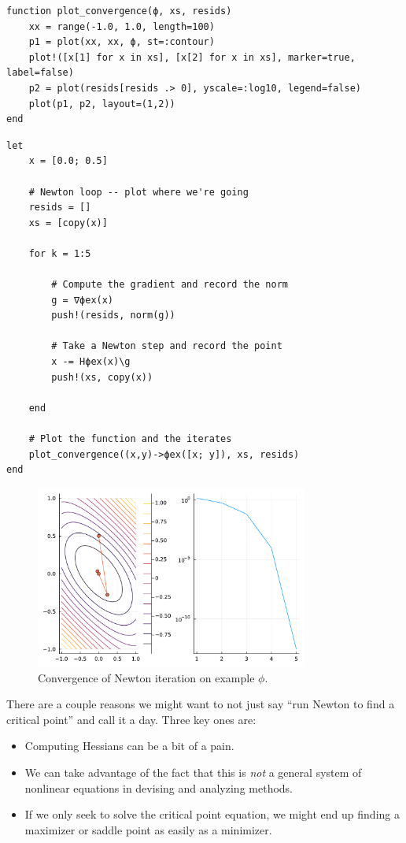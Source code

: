 \documentclass[12pt, leqno]{article} %
\providecommand{\tightlist}{%
  \setlength{\itemsep}{0pt}\setlength{\parskip}{0pt}}
\begin{document}
\begin{verbatim}
function plot_convergence(ϕ, xs, resids)
    xx = range(-1.0, 1.0, length=100)
    p1 = plot(xx, xx, ϕ, st=:contour)
    plot!([x[1] for x in xs], [x[2] for x in xs], marker=true, label=false)
    p2 = plot(resids[resids .> 0], yscale=:log10, legend=false)
    plot(p1, p2, layout=(1,2))
end
\end{verbatim}

\begin{verbatim}
let
    x = [0.0; 0.5]

    # Newton loop -- plot where we're going
    resids = []
    xs = [copy(x)]

    for k = 1:5

        # Compute the gradient and record the norm
        g = ∇ϕex(x)
        push!(resids, norm(g))

        # Take a Newton step and record the point
        x -= Hϕex(x)\g
        push!(xs, copy(x))

    end

    # Plot the function and the iterates
    plot_convergence((x,y)->ϕex([x; y]), xs, resids)
end
\end{verbatim}

\begin{figure}
\begin{center}
  \includegraphics[width=0.8\textwidth]{fig/2023-03-31-newton.pdf}
\end{center}
\caption{Convergence of Newton iteration on example $\phi$.}
\label{fig:newton}
\end{figure}

There are a couple reasons we might want to not just say ``run Newton to
find a critical point'' and call it a day. Three key ones are:

\begin{itemize}
\tightlist
\item
  Computing Hessians can be a bit of a pain.
\item
  We can take advantage of the fact that this is \emph{not} a general
  system of nonlinear equations in devising and analyzing methods.
\item
  If we only seek to solve the critical point equation, we might end up
  finding a maximizer or saddle point as easily as a minimizer.
\end{itemize}
\end{document}
